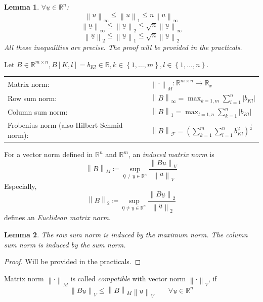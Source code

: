 \documentclass{article}
\newtheorem*{lemma}{Lemma}
\newcommand{\set}[1]{\left\{#1\right\}}
\newcommand{\card}[1]{\left|#1\right|}
\newcommand{\norm}[1]{\left\|#1\right\|}
\begin{document}
\begin{lemma}
  $\forall \underline{u} \in \mathbb R^n$:
  \[ \norm{\underline{u}}_\infty \leq \norm{\underline{u}}_1 \leq n \norm{\underline{u}}_\infty \]
  \[ \norm{\underline{u}}_\infty \leq \norm{\underline{u}}_2 \leq \sqrt{n} \norm{\underline{u}}_\infty \]
  \[ \norm{\underline{u}}_2 \leq \norm{\underline{u}}_1 \leq \sqrt{n} \norm{\underline{u}}_2 \]
  All these inequalities are precise. The proof will be provided in the practicals.
\end{lemma}

Let $B \in \mathbb R^{m \times n}, B[K, l] = b_{Kl} \in \mathbb R, k \in \set{1,\ldots,m}, l \in \set{1,\ldots,n}$.

\begin{tabular}{ll}
  Matrix norm: & $\norm{\cdot}_M: \mathbb R^{m \times n} \to \mathbb R_x$ \\
  Row sum norm: & $\norm{B}_\infty = \max_{k=1,m} \sum_{l=1}^n \card{b_{Kl}}$ \\
  Column sum norm: & $\norm{B}_1 = \max_{l=1,n} \sum_{k=1}^n \card{b_{Kl}}$ \\
  Frobenius norm (also Hilbert-Schmid norm): & $\norm{B}_{\mathcal F} = \left(\sum_{k=1}^m \sum_{l=1}^n b_{Kl}^2\right)^{\frac12}$
\end{tabular}

For a vector norm defined in $\mathbb R^n$ and $\mathbb R^m$, an \emph{induced matrix norm} is
\[ \norm{B}_M \coloneqq \sup_{\underline{0} \neq \underline{u} \in \mathbb R^n} \frac{\norm{B\underline{u}}_V}{\norm{\underline{u}}_V} \]
Especially,
\[ \norm{B}_2 \coloneqq \sup_{\underline{0} \neq \underline{u} \in \mathbb R^n} \frac{\norm{B \underline{u}}_2}{\norm{\underline{u}}_2} \]
defines an \emph{Euclidean matrix norm}.

\begin{lemma}
  The row sum norm is induced by the maximum norm.
  The column sum norm is induced by the sum norm.
\end{lemma}
\begin{proof}
  Will be provided in the practicals.
\end{proof}

Matrix norm $\norm{\cdot}_M$ is called \emph{compatible} with vector norm $\norm{\cdot}_V$, if
\[ \norm{B \underline{u}}_V \leq \norm{B}_M \norm{\underline{u}}_V \qquad \forall \underline{u} \in \mathbb R^n \]
\end{document}
